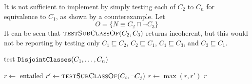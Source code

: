 \documentclass[paper.tex]{subfiles}
\begin{document}
It is not sufficient to implement  by simply testing each of $C_2$ to $C_n$ for equivalence to $C_1$, as shown by a counterexample.  Let
\[ O = \{ N \equiv C_2 \sqcap \neg C_3 \} \]
It can be seen that $\Call{testSubClassOf}{C_2, C_3}$ returns incoherent, but this would not be reporting by testing only $C_1 \sqsubseteq C_2$, $C_2 \sqsubseteq C_1$, $C_1 \sqsubseteq C_3$, and $C_3 \sqsubseteq C_1$.

\medskip

\begin{algorithm}[H]
  \caption{test $\mathtt{DisjointClasses}(C_1, \ldots, C_n)$}
  \begin{algorithmic}[1]
    \raggedright
      \State $r \gets$ entailed
          \State $r' \gets \Call{testSubClassOf}{C_i, \neg C_j}$
          \label{alg:testDisjointClasses:inner}
          \State $r \gets \max(r, r')$
        \EndFor
      \EndFor
      \State \Return $r$
    \EndFunction
  \end{algorithmic}
\end{algorithm}
\end{document}
